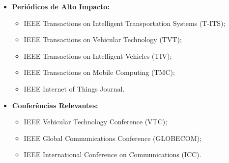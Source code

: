 \begin{itemize}
    \item \textbf{Periódicos de Alto Impacto:}
    \begin{itemize}
        \item IEEE Transactions on Intelligent Transportation Systems (T-\gls{ITS});
        \item IEEE Transactions on Vehicular Technology (TVT);
        \item IEEE Transactions on Intelligent Vehicles (TIV);
        \item IEEE Transactions on Mobile Computing (TMC);
        \item IEEE Internet of Things Journal.
    \end{itemize}
    \item \textbf{Conferências Relevantes:}
    \begin{itemize}
        \item IEEE Vehicular Technology Conference (VTC);
        \item IEEE Global Communications Conference (GLOBECOM);
        \item IEEE International Conference on Communications (ICC).
    \end{itemize}
\end{itemize}
